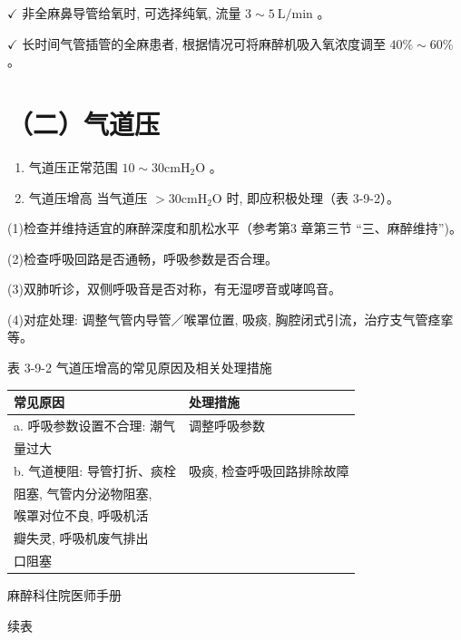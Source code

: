 \documentclass[10pt]{article}
\begin{document}
$\checkmark$ 非全麻鼻导管给氧时, 可选择纯氧, 流量 $3 \sim 5 \mathrm{~L} / \mathrm{min}$ 。

$\checkmark$ 长时间气管插管的全麻患者, 根据情况可将麻醉机吸入氧浓度调至 $40 \% \sim 60 \%$ 。

\section*{（二）气道压}
\begin{enumerate}
  \item 气道压正常范围 $10 \sim 30 \mathrm{cmH}_{2} \mathrm{O}$ 。

  \item 气道压增高 当气道压 $>30 \mathrm{cmH}_{2} \mathrm{O}$ 时, 即应积极处理（表 3-9-2）。

\end{enumerate}

(1)检查并维持适宜的麻醉深度和肌松水平（参考第3 章第三节 “三、麻醉维持”)。

(2)检查呼吸回路是否通畅，呼吸参数是否合理。

(3)双肺听诊，双侧呼吸音是否对称，有无湿啰音或哮鸣音。

(4)对症处理: 调整气管内导管／喉罩位置, 吸痰, 胸腔闭式引流，治疗支气管痉挛等。

表 3-9-2 气道压增高的常见原因及相关处理措施

\begin{center}
\begin{tabular}{ll}
\hline
常见原因 & 处理措施 \\
\hline
a. 呼吸参数设置不合理: 潮气 & 调整呼吸参数 \\
量过大 &  \\
b. 气道梗阻: 导管打折、痰栓 & 吸痰, 检查呼吸回路排除故障 \\
阻塞, 气管内分泌物阻塞, &  \\
喉罩对位不良, 呼吸机活 &  \\
瓣失灵, 呼吸机废气排出 &  \\
口阻塞 &  \\
\hline
\end{tabular}
\end{center}

麻醉科住院医师手册

续表
\end{document}
